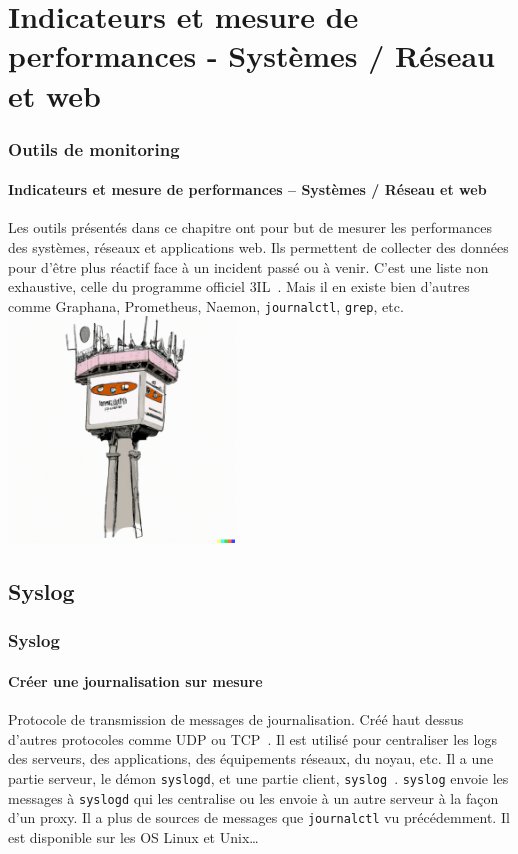 \documentclass{beamer}
\begin{document}
    \section{Indicateurs et mesure de performances - Systèmes / Réseau et web}\label{sec:indicateurs-et-mesure-de-performances--systemes-/-reseau-et-web}

    \begin{frame}
        \transdissolve
        \frametitle{Outils de monitoring}
        \framesubtitle{Indicateurs et mesure de performances – Systèmes / Réseau et web}
        Les outils présentés dans ce chapitre ont pour but de mesurer les performances des systèmes, réseaux et applications web.
        Ils permettent de collecter des données pour d'être plus réactif face à un incident passé ou à venir.
        \bigbreak
        C'est une liste non exhaustive, celle du programme officiel 3IL~.
        Mais il en existe bien d'autres comme Graphana, Prometheus, Naemon, \lstinline{journalctl}, \lstinline{grep}, etc.
        \bigbreak
        \centering
        \includegraphics[width=6cm]{image/control-tower}
    \end{frame}

    \subsection{Syslog}\label{subsec:syslog}

    \begin{frame}
        \transdissolve
        \frametitle{Syslog}
        \framesubtitle{Créer une journalisation sur mesure}
        Protocole de transmission de messages de journalisation.
        Créé haut dessus d'autres protocoles comme UDP ou TCP~.
        \bigbreak
        Il est utilisé pour centraliser les logs des serveurs, des applications, des équipements réseaux, du noyau, etc.
        \bigbreak
        Il a une partie serveur, le démon \lstinline{syslogd}, et une partie client, \lstinline{syslog}~.
        \lstinline{syslog} envoie les messages à \lstinline{syslogd} qui les centralise ou les envoie à un autre serveur à la façon d'un proxy.
        \bigbreak
        Il a plus de sources de messages que \lstinline{journalctl} vu précédemment.
        \bigbreak
        Il est disponible sur les OS Linux et Unix\ldots
    \end{frame}
\end{document}
